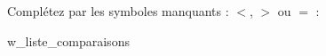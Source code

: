 \begin{exo} 
    Complétez par les symboles manquants : $<$, $>$ ou $=$ :
\end{exo}

\vspace{0.5cm}

\begin{enumerate}
    \begin{multicols}{2}
        {w_liste_comparaisons}
    \end{multicols}
\end{enumerate}